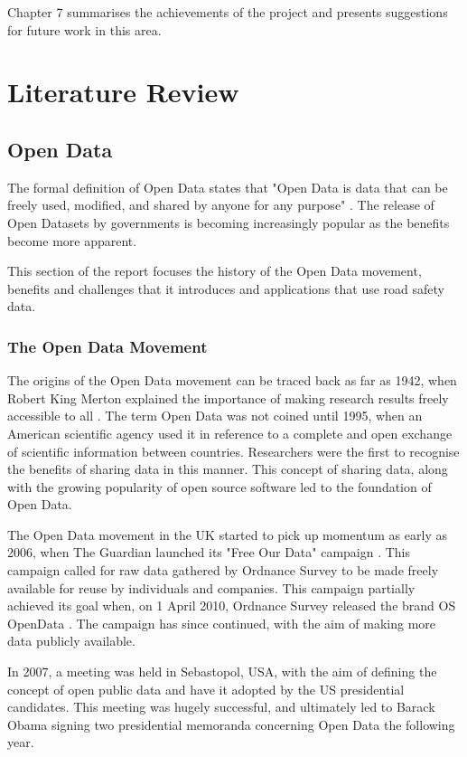 \documentclass[authoryearcitations]{UoYCSproject}
\begin{document}
Chapter 7 summarises the achievements of the project and presents suggestions for future work in this area.

\chapter{Literature Review}

\section{Open Data}

The formal definition of Open Data states that "Open Data is data that can be freely used, modified, and shared by anyone for any purpose" \citep{OpenKnowledge}. The release of Open Datasets by governments is becoming increasingly popular as the benefits become more apparent.

This section of the report focuses the history of the Open Data movement, benefits and challenges that it introduces and applications that use road safety data.

\subsection{The Open Data Movement}

The origins of the Open Data movement can be traced back as far as 1942, when Robert King Merton explained the importance of making research results freely accessible to all \citep{Chignard2013}. The term Open Data was not coined until 1995, when an American scientific agency used it in reference to a complete and open exchange of scientific information between countries. Researchers were the first to recognise the benefits of sharing data in this manner. This concept of sharing data, along with the growing popularity of open source software led to the foundation of Open Data.

The Open Data movement in the UK started to pick up momentum as early as 2006, when The Guardian launched its "Free Our Data" campaign \citep{GuardianTechnology2006}. This campaign called for raw data gathered by Ordnance Survey to be made freely available for reuse by individuals and companies. This campaign partially achieved its goal when, on 1 April 2010, Ordnance Survey released the brand OS OpenData \citep{OrdnanceSurveyteam2010}. The campaign has since continued, with the aim of making more data publicly available. 

In 2007, a meeting was held in Sebastopol, USA, with the aim of defining the concept of open public data and have it adopted by the US presidential candidates. This meeting was hugely successful, and ultimately led to Barack Obama signing two presidential memoranda concerning Open Data the following year. 
\end{document}
